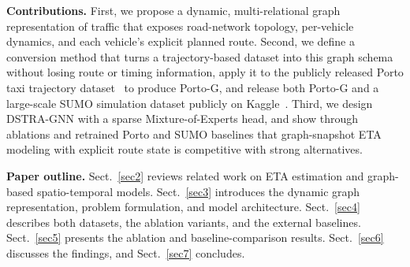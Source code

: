 \textbf{Contributions.} First, we propose a dynamic, multi-relational graph representation of traffic that exposes road-network topology, per-vehicle dynamics, and each vehicle's explicit planned route. Second, we define a conversion method that turns a trajectory-based dataset into this graph schema without losing route or timing information, apply it to the publicly released Porto taxi trajectory dataset~\cite{moreira2013porto} to produce Porto-G, and release both Porto-G and a large-scale SUMO simulation dataset publicly on Kaggle~\cite{tordjman2026sumokaggle,tordjman2026portokaggle}. Third, we design DSTRA-GNN with a sparse Mixture-of-Experts head, and show through ablations and retrained Porto and SUMO baselines that graph-snapshot ETA modeling with explicit route state is competitive with strong alternatives.

\textbf{Paper outline.} Sect.~\ref{sec2} reviews related work on ETA estimation and graph-based spatio-temporal models. Sect.~\ref{sec3} introduces the dynamic graph representation, problem formulation, and model architecture. Sect.~\ref{sec4} describes both datasets, the ablation variants, and the external baselines. Sect.~\ref{sec5} presents the ablation and baseline-comparison results. Sect.~\ref{sec6} discusses the findings, and Sect.~\ref{sec7} concludes.
